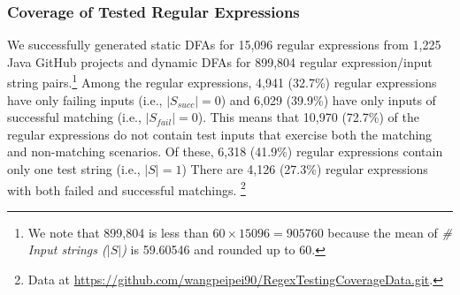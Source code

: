 
\subsubsection{Coverage of Tested Regular Expressions}
We successfully generated static DFAs for 15,096 regular expressions from 1,225 Java GitHub projects  and dynamic DFAs for 899,804 regular expression/input string pairs.\footnote{We note that 899,804 is less than $60 \times 15096 = 905760$ because the mean of {\em\# Input strings ($\lvert S \rvert$)} is 59.60546 and rounded up to 60.}%
Among the regular expressions, 4,941 (32.7\%)  regular expressions have only failing inputs (i.e., $\lvert S_{succ} \rvert = 0$) and 6,029 (39.9\%) have only inputs of successful matching (i.e.,  $\lvert S_{fail} \rvert = 0$). This means that 10,970 (72.7\%) of the regular expressions do not contain test inputs that exercise both the matching and non-matching scenarios. Of these, 6,318 (41.9\%) regular expressions contain only one test string (i.e., $\lvert S \rvert = 1$) There are  4,126 (27.3\%) regular expressions with both failed and successful matchings. \footnote{Data at \url{https://github.com/wangpeipei90/RegexTestingCoverageData.git}.}

